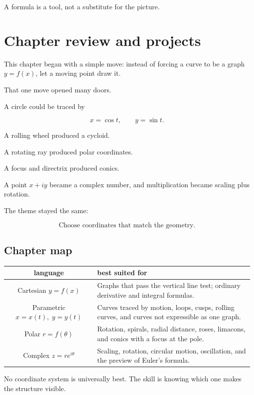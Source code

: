 A formula is a tool, not a substitute for the picture.

\section{Chapter review and projects}
\label{sec:chapter-review-parametric-polar-conics}

This chapter began with a simple move: instead of forcing a curve to be a graph
\(y=f(x)\), let a moving point draw it.

That one move opened many doors.

A circle could be traced by

\[
x=\cos t,
\qquad
y=\sin t.
\]

A rolling wheel produced a cycloid.

A rotating ray produced polar coordinates.

A focus and directrix produced conics.

A point \(x+iy\) became a complex number, and multiplication became scaling plus
rotation.

The theme stayed the same:

\[
\boxed{
\text{Choose coordinates that match the geometry.}
}
\]

\subsection{Chapter map}
\label{subsec:chapter-map-parametric-polar}

\begin{center}
\begin{tabular}{c|p{}}
\textbf{language} & \textbf{best suited for} \\ \hline
Cartesian \(y=f(x)\) & Graphs that pass the vertical line test; ordinary derivative and integral formulas. \\[3pt]
Parametric \(x=x(t),\;y=y(t)\) & Curves traced by motion, loops, cusps, rolling curves, and curves not expressible as one graph. \\[3pt]
Polar \(r=f(\theta)\) & Rotation, spirals, radial distance, roses, limacons, and conics with a focus at the pole. \\[3pt]
Complex \(z=re^{i\theta}\) & Scaling, rotation, circular motion, oscillation, and the preview of Euler's formula.
\end{tabular}
\end{center}

No coordinate system is universally best.  The skill is knowing which one makes the
structure visible.

